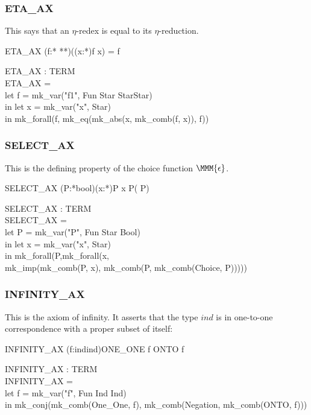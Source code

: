 \documentclass[a4paper,11pt,titlepage]{article}
\begin{document}
\begin{titlepage}
\subsubsection{ETA\_AX}
This says that an $\eta$-redex is equal to
its $\eta$-reduction.
\begin{GFT}{}
\+ETA\_AX \MMM{\Zthm} \MMM{\forall}(f:* \MMM{\rightarrow} **)\MMM{\bullet}(\MMM{\lambda}(x:*)\MMM{\bullet}f x) = f\\
\end{GFT}
\begin{HOLConst}
\+	\PrNL{}ETA\_AX\PrNN{} : TERM\\
\PrPH{}
\+	ETA\_AX =\\
\+	let f = mk\_var("f1", Fun Star StarStar)\\
\+	in let x = mk\_var("x", Star)\\
\+	in mk\_forall(f, mk\_eq(mk\_abs(x, mk\_comb(f, x)), f))\\
\end{HOLConst}
\subsubsection{SELECT\_AX}
This is the defining property of the choice function $\MMM{\epsilon}$.
\begin{GFT}{}
\+SELECT\_AX \MMM{\Zthm} \MMM{\forall}(P:*\MMM{\rightarrow}bool)\MMM{\bullet}\MMM{\forall}(x:*)\MMM{\bullet}P x  \MMM{\Rightarrow}  P(\MMM{\epsilon} P)\\
\end{GFT}
\begin{HOLConst}
\+	\PrNL{}SELECT\_AX\PrNN{} : TERM\\
\PrPH{}
\+	SELECT\_AX =\\
\+	let P = mk\_var("P", Fun Star Bool)\\
\+	in let x = mk\_var("x", Star)\\
\+	in mk\_forall(P,mk\_forall(x,\\
\+			mk\_imp(mk\_comb(P, x), mk\_comb(P, mk\_comb(Choice, P)))))\\
\end{HOLConst}
\subsubsection{INFINITY\_AX}
This is the axiom of infinity. It asserts that the
type $ind$ is in one-to-one correspondence with
a proper subset of itself:
\begin{GFT}{}
\+INFINITY\_AX \MMM{\Zthm} \MMM{\exists}(f:ind\MMM{\rightarrow}ind)\MMM{\bullet}ONE\_ONE f  \MMM{\land}  \MMM{\lnot}ONTO f\\
\end{GFT}
\begin{HOLConst}
\+	\PrNL{}INFINITY\_AX\PrNN{} : TERM\\
\PrPH{}
\+	INFINITY\_AX =\\
\+	let f = mk\_var("f", Fun Ind Ind)\\
\+	in mk\_conj(mk\_comb(One\_One, f), mk\_comb(Negation, mk\_comb(ONTO, f)))\\
\end{HOLConst}


\end{titlepage}
\end{document}
